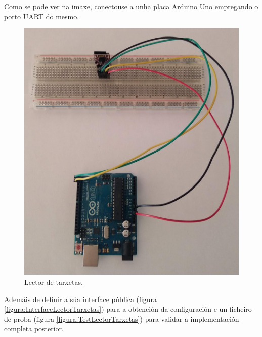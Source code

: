    Como se pode ver na imaxe, conectouse a unha placa Arduino Uno empregando
   o porto UART do mesmo. \\
  
   \begin{figure}[htbp]
    \centering
    \includegraphics[scale=0.2,keepaspectratio=true]{./imagenes/lector-tarxetas.jpg}
    \caption{Lector de tarxetas.}
    \label{figura:LectorTarxetas}
   \end{figure}
   
   Ademáis de definir a súa interface pública (figura 
   \ref{figura:InterfaceLectorTarxetas}) para a obtención da configuración e un
   ficheiro de proba (figura \ref{figura:TestLectorTarxetas}) para validar a
   implementación completa posterior. \\
   
